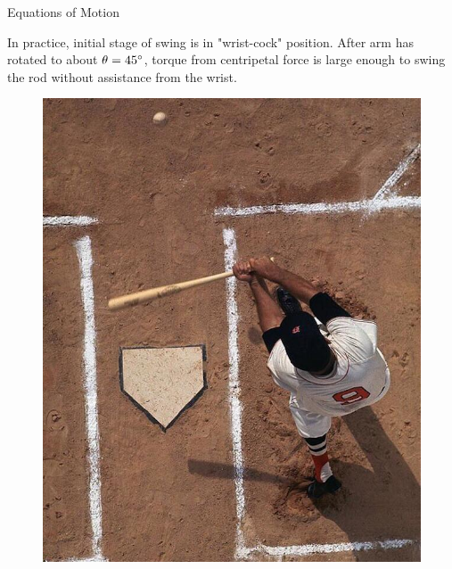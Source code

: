 \documentclass[tikz]{beamer}
\begin{document}
\begin{frame} {Equations of Motion}
	\only<6> {
		In practice, initial stage of swing is in "wrist-cock" position. After arm has rotated to about $\theta = 45 \degree$, torque from centripetal force is large enough to swing the rod without assistance from the wrist.
		\begin{figure}
			\centering
			\includegraphics[scale=0.2]{aerialswing.jpg}
		\end{figure}
	}

\end{frame}
\end{document}
